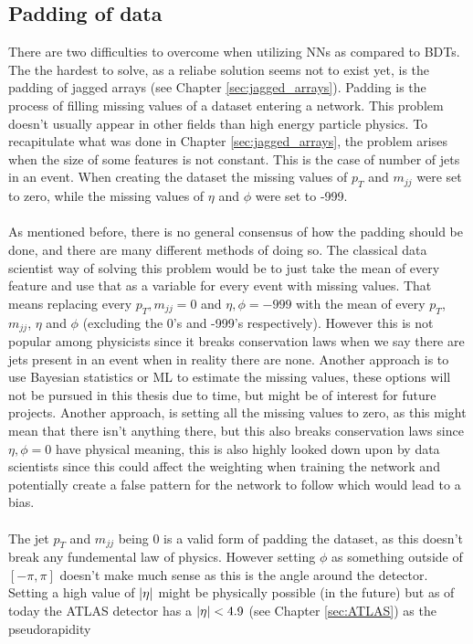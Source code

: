 \documentclass[14pt, a4paper]{book}
\begin{document}
\subsection{Padding of data}\label{sec:padding_NN}
There are two difficulties to overcome when utilizing NNs as compared to BDTs. The the hardest to solve, as a reliabe solution seems not to exist yet, is the padding of jagged arrays (see Chapter \ref{sec:jagged_arrays}).
Padding is the process of filling missing values of a dataset entering a network. This problem doesn't usually appear in other fields than high energy particle physics. To recapitulate what was done in Chapter \ref{sec:jagged_arrays}, the problem arises when the size 
of some features is not constant. This is the case of number of jets in an event. When creating the dataset the missing values of $p_T$ and $m_{jj}$ were set to zero, while the missing values of $\eta$ and $\phi$ were set to -999.\\
\\As mentioned before, there is no general consensus of how the padding should be done, and there are many different methods of doing so. The classical data scientist way of solving this problem would be to just take 
the mean of every feature and use that as a variable for every event with missing values. That means replacing every $p_T, m_{jj} = 0$ and $\eta,\phi=-999$ with the mean of every $p_T$, $m_{jj}$, $\eta$ and $\phi$ (excluding the 0's and -999's respectively). 
However this is not popular among physicists since it breaks conservation laws when we say there are jets present in an event when in reality there are none. Another approach is to use Bayesian statistics or ML to estimate the missing values, 
these options will not be pursued in this thesis due to time, but might be of interest for future projects. Another approach, is setting all the missing values to zero, as this might mean that there isn't anything there, 
but this also breaks conservation laws since $\eta,\phi=0$ have physical meaning, this is also highly looked down upon by data scientists since this could affect the weighting when training the network and potentially create a false pattern for the network to follow which would lead to a bias.\\ 
\\The jet $p_T$ and $m_{jj}$ being 0 is a valid form of padding the dataset, as this doesn't break any fundemental law of physics. However setting $\phi$ as something outside of $[-\pi,\pi]$ doesn't make much sense 
as this is the angle around the detector. Setting a high value of $\abs{\eta}$ might be physically possible (in the future) but as of today the ATLAS detector has a $\abs{\eta}<4.9$ (see Chapter \ref{sec:ATLAS}) as the pseudorapidity 
\end{document}
